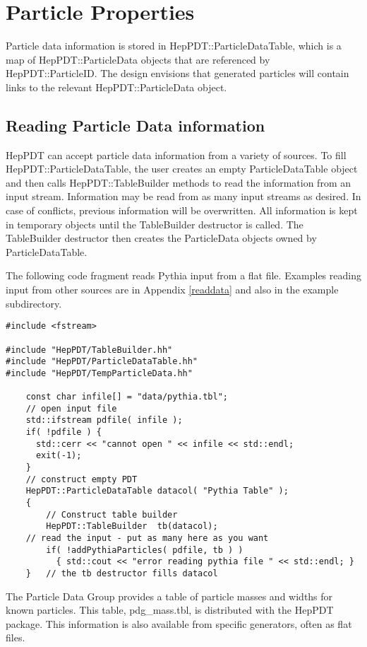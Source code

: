 \section { Particle Properties }

Particle data information is stored in HepPDT::ParticleDataTable, 
which is a map of HepPDT::ParticleData objects
that are referenced by HepPDT::ParticleID. 
The design envisions that generated particles will contain links
to the relevant  HepPDT::ParticleData object.

\subsection { Reading Particle Data information }

HepPDT can accept particle data information from a variety of sources.
To fill HepPDT::ParticleDataTable, 
the user creates an empty ParticleDataTable object
and then calls HepPDT::TableBuilder methods to read the information 
from an input stream.
Information may be read from as many input streams as desired.
In case of conflicts, previous information will be overwritten.
All information is kept in temporary objects until the TableBuilder destructor
is called.  
The TableBuilder destructor then creates the ParticleData objects owned
by ParticleDataTable.  

The following code fragment reads Pythia input from a flat file.
Examples reading input from other sources are in Appendix \ref{readdata} 
and also in the example subdirectory. 

\begin{verbatim}
#include <fstream>

#include "HepPDT/TableBuilder.hh"
#include "HepPDT/ParticleDataTable.hh"
#include "HepPDT/TempParticleData.hh"

    const char infile[] = "data/pythia.tbl";
    // open input file
    std::ifstream pdfile( infile );
    if( !pdfile ) { 
      std::cerr << "cannot open " << infile << std::endl;
      exit(-1);
    }
    // construct empty PDT
    HepPDT::ParticleDataTable datacol( "Pythia Table" );
    {
        // Construct table builder
        HepPDT::TableBuilder  tb(datacol);
	// read the input - put as many here as you want
        if( !addPythiaParticles( pdfile, tb ) ) 
	      { std::cout << "error reading pythia file " << std::endl; }
    }	// the tb destructor fills datacol
\end{verbatim}

The Particle Data Group provides a table of particle masses and widths for known
particles.  This table,  pdg\_mass.tbl, is distributed with the HepPDT package.
This information is also available from specific generators, often as
flat files.  

